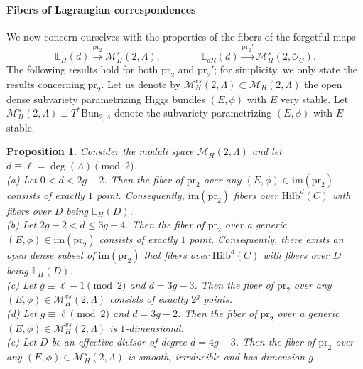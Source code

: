 \documentclass[twoside, 11pt]{article}
\numberwithin{equation}{section}
\theoremstyle{theorem}
\numberwithin{theorem}{section}
\newtheorem{proposition}[proposition]{Proposition}
\theoremstyle{definition}
\begin{document}
\paragraph{Fibers of Lagrangian correspondences}
We now concern ourselves with the properties of the fibers of the forgetful maps 
\[ \mathbb{L}_H(d) \overset{\mathrm{pr}_2}{\longrightarrow} \mathcal{M}_H^{s}(2, \Lambda), \qquad \qquad 
\mathbb{L}_{dR}(d) \overset{\mathrm{pr}_2'}{\longrightarrow} \mathcal{M}_H^{s}(2, \mathcal{O}_C). \]
The following results hold for both $\mathrm{pr}_2$ and $\mathrm{pr}_2'$; for simplicity, we only state the results concerning $\mathrm{pr}_2$. 
Let us denote by $\mathcal{M}_H^{vs}(2, \Lambda) \subset \mathcal{M}_H(2, \Lambda)$ the open dense subvariety parametrizing Higgs bundles $(E, \phi)$ with $E$ very stable. 
Let $\mathcal{M}_H^{s}(2, \Lambda) \equiv T^\ast\mathrm{Bun}_{2, \Lambda}$ denote the subvariety parametrizing $(E, \phi)$ with $E$ stable.

\begin{proposition} \label{prop-fiber-Lag-cor}
Consider the moduli space $\mathcal{M}_H(2, \Lambda)$ and let $d \equiv \ell = \deg(\Lambda) \pmod{2}$. 
\\
(a) Let $0 < d < 2g-2$. Then the fiber of $\mathrm{pr}_2$ over any $(E, \phi) \in \mathrm{im}(\mathrm{pr}_2)$ consists of exactly $1$ point. Consequently, $\mathrm{im}(\mathrm{pr}_2)$ fibers over $\mathrm{Hilb}^d(C)$ with fibers over $D$ being $\mathbb{L}_H(D)$.
\\
(b) Let $2g-2 < d \leq 3g-4$. Then the fiber of $\mathrm{pr}_2$ over a generic $(E, \phi) \in \mathrm{im}(\mathrm{pr}_2)$ consists of exactly $1$ point. Consequently, there exists an open dense subset of $\mathrm{im}(\mathrm{pr}_2)$ that fibers over $\mathrm{Hilb}^d(C)$ with fibers over $D$ being $\mathbb{L}_H(D)$.
\\
(c) Let $g \equiv \ell-1 \pmod{2}$ and $d = 3g-3$. Then the fiber of $\mathrm{pr}_2$ over any $(E,\phi) \in \mathcal{M}_H^{vs}(2, \Lambda)$ consists of exactly $2^g$ points.
\\ 
(d) Let $g \equiv \ell \pmod{2}$ and $d = 3g-2$. Then the fiber of $\mathrm{pr}_2$ over a generic $(E,\phi) \in \mathcal{M}_H^{vs}(2, \Lambda)$ is $1$-dimensional.
\\
(e) Let $D$ be an effective divisor of degree $d = 4g-3$. Then the fiber of $\mathrm{pr}_2$ over any $(E,\phi) \in \mathcal{M}_H^{s}(2, \Lambda)$ is smooth, irreducible and has dimension $g$. 
\end{proposition}
\end{document}
